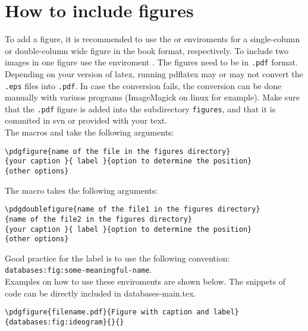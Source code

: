 \section{How to include figures}

To add a figure, it is recommended to use the {\tt \string\pdgfigure} or {\tt \string\pdgwidefigure} enviroments
for a single-column or double-column wide figure in the book format, respectively. To include two images in one figure use the enviroment {\tt \string\pdgdoublefigure}.
The figures need to be in {\tt .pdf} format. Depending on your version of latex, running pdflatex may or may not convert the {\tt .eps} files into {\tt .pdf}. In case the conversion fails, the conversion can be done manually with variuos programs (ImageMagick on linux for example).
Make sure that the {\tt .pdf} figure is added into the subdirectory {\tt figures}, and that it is commited in svn or provided with your text.\\
The macros {\tt \string\pdgfigure} and {\tt \string\pdgwidefigure} take the following arguments:
\begin{verbatim}
\pdgfigure{name of the file in the figures directory}
{your caption }{ label }{option to determine the position}
{other options}
\end{verbatim}
The macro {\tt \string\pdgdoublefigure} takes the following arguments:
\begin{verbatim}
\pdgdoublefigure{name of the file1 in the figures directory}
{name of the file2 in the figures directory}
{your caption }{ label }{option to determine the position}
{other options}
\end{verbatim}

Good practice for the label is to use the following convention: {\tt databases:fig:some-meaningful-name}.\\
Examples on how to use these enviroments are shown below. The snippets of code can be directly included in databases-main.tex.
\begin{verbatim}
\pdgfigure{filename.pdf}{Figure with caption and label}
{databases:fig:ideogram}{}{}
\end{verbatim}

